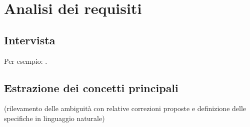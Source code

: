 \section{Analisi dei requisiti}
\subsection{Intervista}
Per esempio: \cite{GitHub}.

\subsection{Estrazione dei concetti principali}
(rilevamento delle ambiguità con relative correzioni proposte e definizione delle specifiche in linguaggio naturale)
